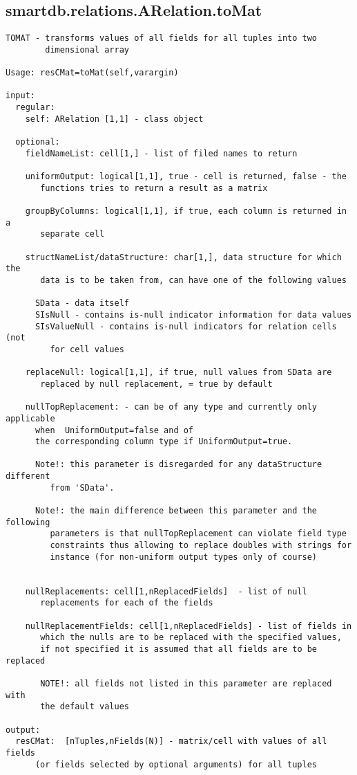 \subsection{\texorpdfstring{smartdb.relations.ARelation.toMat}{toMat}}\label{method:smartdb.relations.ARelation.toMat}
\begin{verbatim}
TOMAT - transforms values of all fields for all tuples into two
        dimensional array

Usage: resCMat=toMat(self,varargin)

input:
  regular:
    self: ARelation [1,1] - class object

  optional:
    fieldNameList: cell[1,] - list of filed names to return

    uniformOutput: logical[1,1], true - cell is returned, false - the
       functions tries to return a result as a matrix

    groupByColumns: logical[1,1], if true, each column is returned in a
       separate cell

    structNameList/dataStructure: char[1,], data structure for which the
       data is to be taken from, can have one of the following values

      SData - data itself
      SIsNull - contains is-null indicator information for data values
      SIsValueNull - contains is-null indicators for relation cells (not
         for cell values

    replaceNull: logical[1,1], if true, null values from SData are
       replaced by null replacement, = true by default

    nullTopReplacement: - can be of any type and currently only applicable
      when  UniformOutput=false and of
      the corresponding column type if UniformOutput=true.

      Note!: this parameter is disregarded for any dataStructure different
         from 'SData'.

      Note!: the main difference between this parameter and the following
         parameters is that nullTopReplacement can violate field type
         constraints thus allowing to replace doubles with strings for
         instance (for non-uniform output types only of course)


    nullReplacements: cell[1,nReplacedFields]  - list of null
       replacements for each of the fields

    nullReplacementFields: cell[1,nReplacedFields] - list of fields in
       which the nulls are to be replaced with the specified values,
       if not specified it is assumed that all fields are to be replaced

       NOTE!: all fields not listed in this parameter are replaced with
       the default values

output:
  resCMat:  [nTuples,nFields(N)] - matrix/cell with values of all fields
      (or fields selected by optional arguments) for all tuples
\end{verbatim}
